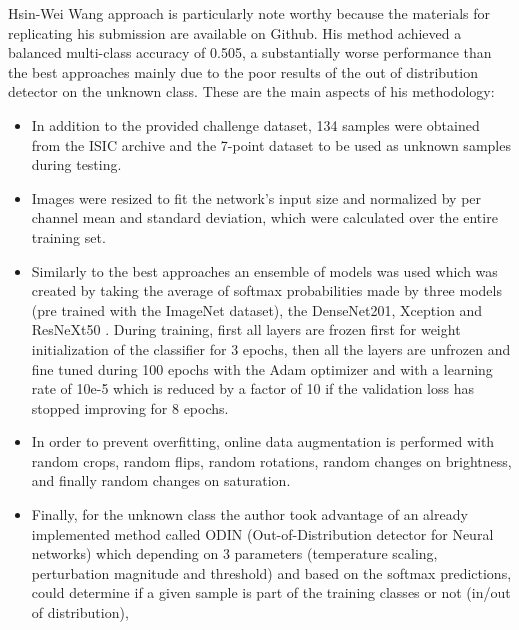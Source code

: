     Hsin-Wei Wang approach \cite{Wang} is particularly note worthy because the materials for replicating his submission are available on Github. His method achieved a balanced multi-class accuracy of 0.505, a substantially worse performance than the best approaches mainly due to the poor results of the out of distribution detector on the unknown class. These are the main aspects of his methodology: 
    \begin{itemize}
        \item In addition to the provided challenge dataset, 134 samples were obtained from the ISIC archive and the 7-point dataset to be used as unknown samples during testing. 
        \item Images were resized to fit the network's input size and normalized by per channel mean and standard deviation, which were calculated over the entire training set. 
        \item Similarly to the best approaches an ensemble of models was used which was created by taking the average of softmax probabilities made by three models (pre trained with the ImageNet dataset), the DenseNet201, Xception and ResNeXt50 . During training, first all layers are frozen first for weight initialization of the classifier for 3 epochs, then all the layers are unfrozen and fine tuned during 100 epochs with the Adam optimizer \cite{adam} and with a learning rate of 10e-5 which is reduced by a factor of 10 if the validation loss has stopped improving for 8 epochs. 
        \item In order to prevent overfitting, online data augmentation is performed with random crops, random flips, random rotations, random changes on brightness, and finally random changes on saturation.  
        \item Finally, for the unknown class the author took advantage of an already implemented method called ODIN (Out-of-Distribution detector for Neural networks) \cite{odin} which depending on 3 parameters (temperature scaling, perturbation magnitude and threshold) and based on the softmax predictions, could determine if a given sample is part of the training classes or not (in/out of distribution), 
    \end{itemize}
    
    
